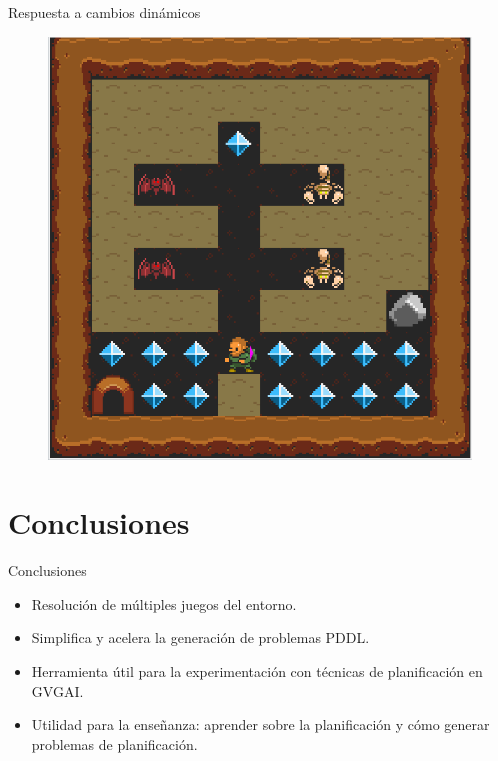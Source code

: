 \documentclass[11pt]{beamer}    %
\begin{document}
    \begin{frame}{Respuesta a cambios dinámicos}
        \begin{figure}
            \centering
            \includegraphics[scale=0.3]{img/presentation/discrepancy}
        \end{figure}
    \end{frame}

    \section{Conclusiones}

    \begin{frame}{Conclusiones}
        \begin{itemize}
            \item Resolución de múltiples juegos del entorno.
            \item Simplifica y acelera la generación de problemas PDDL.
            \item Herramienta útil para la experimentación con técnicas de planificación
            en GVGAI.
            \item Utilidad para la enseñanza: aprender sobre la planificación y cómo
            generar problemas de planificación.
        \end{itemize}
    \end{frame}
\end{document}
